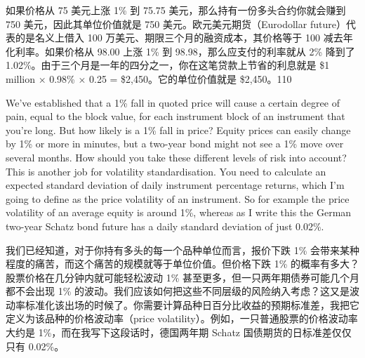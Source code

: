 \begin{chineseblock}如果价格从 75 美元上涨 1\% 到 75.75 美元，那么持有一份多头合约你就会赚到 750 美元，因此其单位价值就是 750 美元。欧元美元期货（Eurodollar future）代表的是名义上借入 100 万美元、期限三个月的融资成本，其价格等于 100 减去年化利率。如果价格从 98.00 上涨 1\% 到 98.98，那么应支付的利率就从 2\% 降到了 1.02\%。由于三个月是一年的四分之一，你在这笔贷款上节省的利息就是 \$1 million × 0.98\% × 0.25 = \$2,450。它的单位价值就是 \$2,450。110 \end{chineseblock}


\begin{englishblock} We've established that a 1\% fall in quoted price will cause a certain degree of pain, equal to the block value, for each instrument block of an instrument that you're long. But how likely is a 1\% fall in price? Equity prices can easily change by 1\% or more in minutes, but a two-year bond might not see a 1\% move over several months. How should you take these different levels of risk into account? This is another job for volatility standardisation. You need to calculate an expected standard deviation of daily instrument percentage returns, which I'm going to define as the price volatility of an instrument. So for example the price volatility of an average equity is around 1\%, whereas as I write this the German two-year Schatz bond future has a daily standard deviation of just 0.02\%. \end{englishblock}

\begin{chineseblock}我们已经知道，对于你持有多头的每一个品种单位而言，报价下跌 1\% 会带来某种程度的痛苦，而这个痛苦的规模就等于单位价值。但价格下跌 1\% 的概率有多大？股票价格在几分钟内就可能轻松波动 1\% 甚至更多，但一只两年期债券可能几个月都不会出现 1\% 的波动。我们应该如何把这些不同层级的风险纳入考虑？这又是波动率标准化该出场的时候了。你需要计算品种日百分比收益的预期标准差，我把它定义为该品种的价格波动率（price volatility）。例如，一只普通股票的价格波动率大约是 1\%，而在我写下这段话时，德国两年期 Schatz 国债期货的日标准差仅仅只有 0.02\%。 \end{chineseblock}

\bipairgap


